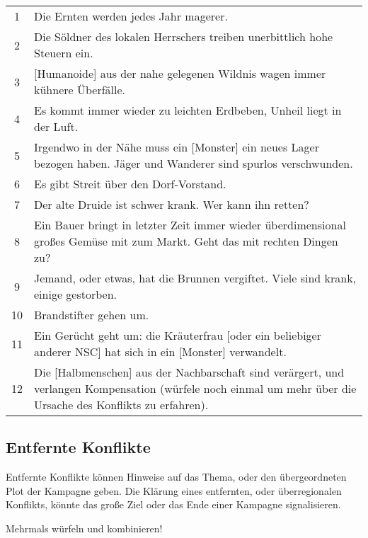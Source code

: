 \documentclass[11pt]{wbzine}
\begin{document}
\begin{tabularx}{\columnwidth}{cZ}
1 & Die Ernten werden jedes Jahr magerer.\\
2 & Die Söldner des lokalen Herrschers treiben unerbittlich hohe
Steuern ein. \\
3 & [Humanoide] aus der nahe gelegenen Wildnis wagen immer kühnere
Überfälle.\\
4 & Es kommt immer wieder zu leichten Erdbeben, Unheil liegt in der
Luft.\\
5 & Irgendwo in der Nähe muss ein [Monster] ein neues Lager bezogen
haben. Jäger und Wanderer sind spurlos verschwunden.\\
6 & Es gibt Streit über den Dorf-Vorstand.\\
7 & Der alte Druide ist schwer krank. Wer kann ihn retten?\\
8 & Ein Bauer bringt in letzter Zeit immer wieder überdimensional
großes Gemüse mit zum Markt. Geht das mit rechten Dingen zu?\\
9 & Jemand, oder etwas, hat die Brunnen vergiftet. Viele sind krank,
einige gestorben.\\
10 & Brandstifter gehen um.\\
11 & Ein Gerücht geht um: die Kräuterfrau [oder ein beliebiger
anderer NSC] hat sich in ein [Monster] verwandelt.\\
12 & Die [Halbmenschen] aus der Nachbarschaft sind verärgert, und
verlangen Kompensation (würfele noch einmal um mehr über die Ursache
des Konflikts zu erfahren).\\
\end{tabularx}

\subsection{Entfernte Konflikte}

Entfernte Konflikte können Hinweise auf das Thema, oder den
übergeordneten Plot der Kampagne geben. Die Klärung eines
entfernten, oder überregionalen Konflikts, könnte das 
große Ziel oder das Ende einer Kampagne signalisieren.

Mehrmals würfeln und kombinieren!
\end{document}
